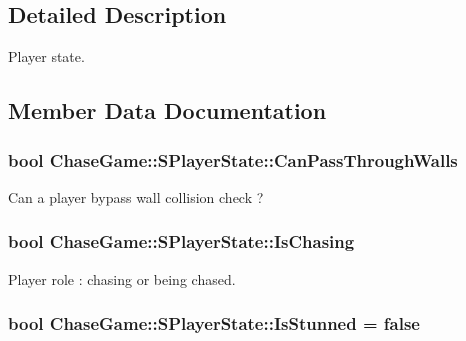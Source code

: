 \subsection{Detailed Description}
Player state. 

\subsection{Member Data Documentation}
\hypertarget{struct_chase_game_1_1_s_player_state_acd7030969c414605901e551171078bb1}{
\subsubsection[{Can\-Pass\-Through\-Walls}]{\setlength{\rightskip}{0pt plus 5cm}bool Chase\-Game\-::\-S\-Player\-State\-::\-Can\-Pass\-Through\-Walls}}\label{struct_chase_game_1_1_s_player_state_acd7030969c414605901e551171078bb1}


Can a player bypass wall collision check ? 

\hypertarget{struct_chase_game_1_1_s_player_state_a2574de666d4744daefd7824b1c3c809f}{
\subsubsection[{Is\-Chasing}]{\setlength{\rightskip}{0pt plus 5cm}bool Chase\-Game\-::\-S\-Player\-State\-::\-Is\-Chasing}}\label{struct_chase_game_1_1_s_player_state_a2574de666d4744daefd7824b1c3c809f}


Player role \-: chasing or being chased. 

\hypertarget{struct_chase_game_1_1_s_player_state_a83d45366d7024b55d2e05ca8338846a0}{
\subsubsection[{Is\-Stunned}]{\setlength{\rightskip}{0pt plus 5cm}bool Chase\-Game\-::\-S\-Player\-State\-::\-Is\-Stunned = false}}\label{struct_chase_game_1_1_s_player_state_a83d45366d7024b55d2e05ca8338846a0}


